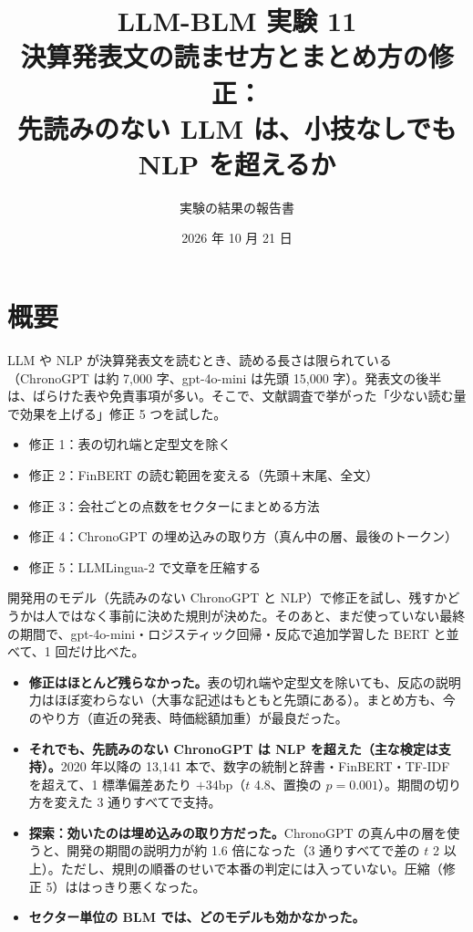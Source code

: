 \documentclass[xelatex,ja=standard,jafont=haranoaji,a4paper,10pt,openany]{bxjsreport}
\title{LLM-BLM 実験 11\\[6pt]
  \large 決算発表文の読ませ方とまとめ方の修正：\\先読みのない LLM は、小技なしでも NLP を超えるか}
\author{実験の結果の報告書}
\date{2026 年 10 月 21 日}
\begin{document}
\maketitle

\chapter*{概要}

LLM や NLP が決算発表文を読むとき、読める長さは限られている（ChronoGPT は約 7,000 字、gpt-4o-mini は先頭 15,000 字）。発表文の後半は、ばらけた表や免責事項が多い。そこで、文献調査で挙がった「少ない読む量で効果を上げる」修正 5 つを試した。

\begin{itemize}
\item 修正 1：表の切れ端と定型文を除く
\item 修正 2：FinBERT の読む範囲を変える（先頭＋末尾、全文）
\item 修正 3：会社ごとの点数をセクターにまとめる方法
\item 修正 4：ChronoGPT の埋め込みの取り方（真ん中の層、最後のトークン）
\item 修正 5：LLMLingua-2 で文章を圧縮する
\end{itemize}

開発用のモデル（先読みのない ChronoGPT と NLP）で修正を試し、残すかどうかは人ではなく事前に決めた規則が決めた。そのあと、まだ使っていない最終の期間で、gpt-4o-mini・ロジスティック回帰・反応で追加学習した BERT と並べて、1 回だけ比べた。

\begin{keybox}[主な結論]
\begin{itemize}
\item \textbf{修正はほとんど残らなかった。}表の切れ端や定型文を除いても、反応の説明力はほぼ変わらない（大事な記述はもともと先頭にある）。まとめ方も、今のやり方（直近の発表、時価総額加重）が最良だった。
\item \textbf{それでも、先読みのない ChronoGPT は NLP を超えた（主な検定は支持）。}2020 年以降の 13,141 本で、数字の統制と辞書・FinBERT・TF-IDF を超えて、1 標準偏差あたり $+34$bp（$t$ 4.8、置換の $p=0.001$）。期間の切り方を変えた 3 通りすべてで支持。
\item \textbf{探索：効いたのは埋め込みの取り方だった。}ChronoGPT の真ん中の層を使うと、開発の期間の説明力が約 1.6 倍になった（3 通りすべてで差の $t$ 2 以上）。ただし、規則の順番のせいで本番の判定には入っていない。圧縮（修正 5）ははっきり悪くなった。
\item \textbf{セクター単位の BLM では、どのモデルも効かなかった。}
\end{itemize}
\end{keybox}
\end{document}
